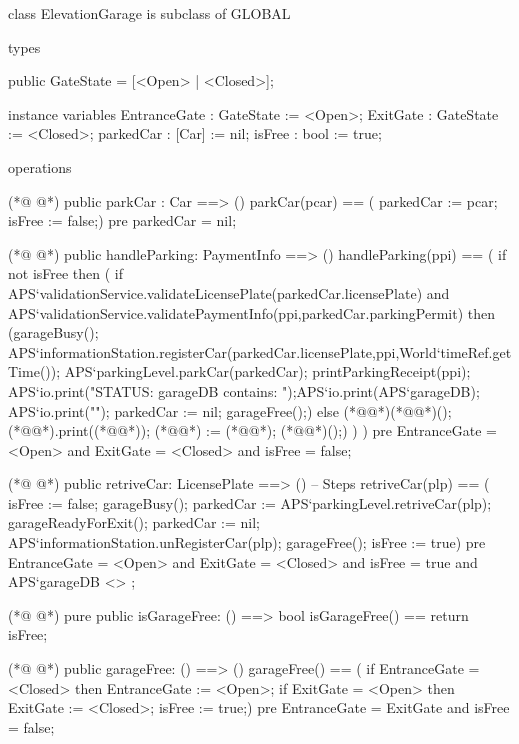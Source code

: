 \begin{vdmpp}[breaklines=true]
class ElevationGarage is subclass of GLOBAL

types

public GateState = [<Open> | <Closed>];

instance variables
 EntranceGate : GateState := <Open>;
 ExitGate : GateState := <Closed>;
 parkedCar : [Car] := nil; 
 isFree : bool := true;

operations
 
(*@
\label{parkCar:15}
@*)
public parkCar : Car ==> ()
parkCar(pcar) == (
 parkedCar := pcar;
 isFree := false;)
pre parkedCar = nil; 
 
(*@
\label{handleParking:21}
@*)
public handleParking:  PaymentInfo ==> ()
handleParking(ppi) == ( 
 if not isFree
  then (
     if APS`validationService.validateLicensePlate(parkedCar.licensePlate) and 
     APS`validationService.validatePaymentInfo(ppi,parkedCar.parkingPermit)
       then (garageBusy();
          APS`informationStation.registerCar(parkedCar.licensePlate,ppi,World`timeRef.getTime());
          APS`parkingLevel.parkCar(parkedCar);
          printParkingReceipt(ppi);
          APS`io.print("STATUS: garageDB contains: ");APS`io.print(APS`garageDB); APS`io.print("\n");
          parkedCar := nil;
          garageFree();)
     else 
     (*@\vdmnotcovered{(}@*)(*@@*)();  
     (*@@*).print((*@@*)); 
     (*@@*) := (*@@*);
     (*@@*)();)
     )
)
pre EntranceGate = <Open> and ExitGate = <Closed> and isFree = false; 
  
(*@
\label{retriveCar:43}
@*)
public retriveCar: LicensePlate ==> () -- Steps
retriveCar(plp) == (
 isFree := false;
 garageBusy();
 parkedCar := APS`parkingLevel.retriveCar(plp);
 garageReadyForExit();
 parkedCar := nil;
 APS`informationStation.unRegisterCar(plp);
 garageFree();
 isFree := true)
pre EntranceGate = <Open> and ExitGate = <Closed> and 
  isFree = true and APS`garageDB <> {} ; 
  
(*@
\label{isGarageFree:56}
@*)
pure public isGarageFree: () ==> bool
isGarageFree() == 
 return isFree;
 
(*@
\label{garageFree:60}
@*)
public garageFree: () ==> ()
garageFree() == (
 if EntranceGate = <Closed>
   then EntranceGate := <Open>;
 if ExitGate = <Open>
   then ExitGate := <Closed>;
 isFree := true;)
pre EntranceGate = ExitGate and isFree = false;


\end{vdmpp}

